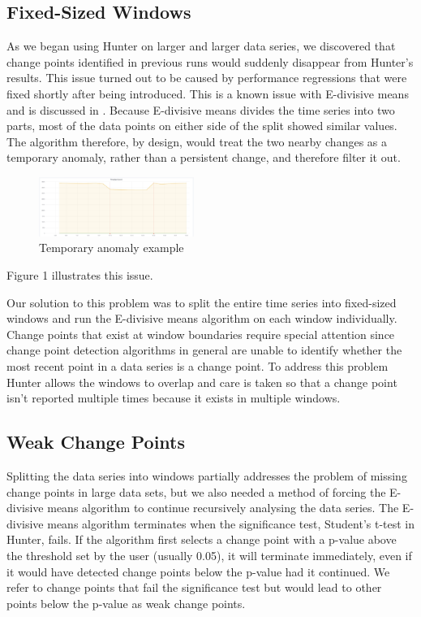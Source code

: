 \documentclass[sigconf]{acmart}
\begin{document}
\subsection{Fixed-Sized Windows}
As we began using Hunter on larger and larger data series, we discovered that change points identified in previous runs would suddenly disappear from Hunter’s results. This issue turned out to be caused by performance regressions that were fixed shortly after being introduced. This is a known issue with E-divisive means and is discussed in \cite{MONGOCPD}. Because E-divisive means divides the time series into two parts, most of the data points on either side of the split showed similar values. The algorithm therefore, by design, would treat the two nearby changes as a temporary anomaly, rather than a persistent change, and therefore filter it out. 

\begin{figure}
	\includegraphics[width=0.45\textwidth]{hunter-regr-mod}
	\caption{Temporary anomaly example}\label{Figure 1}
\end{figure}

Figure 1 illustrates this issue.

Our solution to this problem was to split the entire time series into fixed-sized windows and run the E-divisive means algorithm on each window individually. Change points that exist at window boundaries require special attention since change point detection algorithms in general are unable to identify whether the most recent point in a data series is a change point. To address this problem Hunter allows the windows to overlap and care is taken so that a change point isn’t reported multiple times because it exists in multiple windows.

\subsection{Weak Change Points}
Splitting the data series into windows partially addresses the problem of missing change points in
large data sets, but we also needed a method of forcing the E-divisive means algorithm to continue
recursively analysing the data series. The E-divisive means algorithm terminates when the
significance test, Student's t-test in Hunter, fails. If the algorithm first selects a change point with a p-value above the threshold set by the user (usually 0.05), it will terminate immediately, even if it would have detected change points below the p-value had it continued. We refer to change points that fail the significance test but would lead to other points below the p-value as weak change points.
\end{document}
